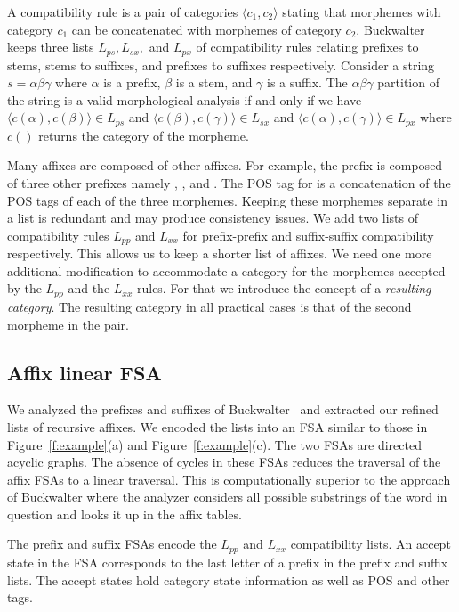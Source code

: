 \documentclass[11pt,letterpaper]{article}
\begin{document}
A compatibility rule is a pair of categories 
$\langle c_1, c_2\rangle$  stating that morphemes
with category $c_1$ can be concatenated with morphemes
of category $c_2$. 
Buckwalter keeps three lists $L_{ps}, L_{sx},$ and $L_{px}$ 
of compatibility rules relating
prefixes to stems, stems to suffixes, and prefixes to suffixes
respectively. 
Consider a string $s=\alpha\beta\gamma$ where $\alpha$ is 
a prefix, $\beta$ is a stem, and $\gamma$ is a suffix. 
The $\alpha\beta\gamma$ partition of the string is a 
valid morphological analysis if  and only if we have
$\langle c(\alpha),c(\beta)\rangle \in L_{ps}$ and
$\langle c(\beta),c(\gamma)\rangle \in L_{sx}$ and
$\langle c(\alpha),c(\gamma)\rangle \in L_{px}$ where
$c()$ returns the category of the morpheme.

Many affixes are composed of other affixes. For example,
the prefix  is composed of three other prefixes
namely , , and .
The POS tag for  is a concatenation
of the POS tags of each of the three morphemes. 
Keeping these morphemes separate in a list
is redundant and may produce consistency issues. 
We add two lists of compatibility rules $L_{pp}$ and
$L_{xx}$ for prefix-prefix and suffix-suffix compatibility
respectively.
This allows us to keep a shorter list of affixes. 
We need one more additional modification to accommodate 
a category for the morphemes accepted by the $L_{pp}$
and the $L_{xx}$ rules. For that we introduce the concept
of a {\em resulting category}. 
The resulting category in all practical cases
is that of the second morpheme in the pair. 

\subsection{Affix linear FSA}
\label{sec:affixFSA}

We analyzed the prefixes and suffixes of 
Buckwalter~
and extracted our refined lists of recursive affixes.
We encoded the lists into an FSA similar to those
in Figure~\ref{f:example}(a) and Figure~\ref{f:example}(c).
The two FSAs are directed acyclic graphs. 
The absence of cycles in these FSAs reduces the 
traversal of the affix FSAs to a linear traversal.
This is computationally superior to the 
approach of Buckwalter where the analyzer considers
all possible substrings of the word in question
and looks it up in the affix tables. 

The prefix and suffix FSAs encode the $L_{pp}$ and
$L_{xx}$ compatibility lists.
An accept state in the FSA corresponds to the last letter 
of a prefix in the prefix and suffix lists.
The accept states hold category state information as well
as POS and other tags.
\end{document}
